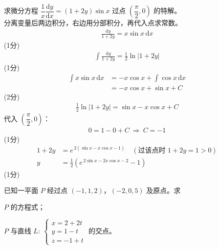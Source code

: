 \begin{solution}
    求微分方程 $\dfrac1x\dfrac{\mathrm{d}y}{\mathrm{d}x}=(1+2y)\sin x$ 过点 $\left(\dfrac{\pi}{2},0\right)$ 的特解。\\
    分离变量后两边积分，右边用分部积分，再代入点求常数。\\
    \begin{align*}
        \frac{\mathrm{d}y}{1+2y}=x\sin x\,\mathrm{d}x
    \end{align*}
    \hfill (1分) \\
    \begin{align*}
        \int\frac{\mathrm{d}y}{1+2y}=\frac12\ln|1+2y|
    \end{align*}
    \hfill (1分) \\
    \begin{align*}
        \int x\sin x\,\mathrm{d}x &=-x\cos x+\int\cos x\,\mathrm{d}x \\
        &=-x\cos x+\sin x+C
    \end{align*}
    \hfill (2分) \\
    \begin{align*}
        \frac12\ln|1+2y|=\sin x-x\cos x+C
    \end{align*}
    代入 $\left(\dfrac{\pi}{2},0\right)$：
    \begin{align*}
        0=1-0+C\ \Rightarrow\ C=-1
    \end{align*}
    \hfill (1分) \\
    \begin{align*}
        1+2y &=e^{\,2(\sin x-x\cos x-1)}\quad(\text{过该点时 }1+2y=1>0) \\
        y &=\frac12\left(e^{\,2\sin x-2x\cos x-2}-1\right)
    \end{align*}
    \hfill (1分)
\end{solution}

\begin{question}[points = 6]
    已知一平面 $P$ 经过点 $(-1,1,2)$，$(-2,0,5)$ 及原点。求
    \begin{questionparts}
        \item $P$ 的方程式； 

        \item $P$ 与直线 $L:\ \begin{cases} x=2+2t \\ y=1-t \\ z=-1+t \end{cases}$ 的交点。 
    \end{questionparts}
\end{question}

